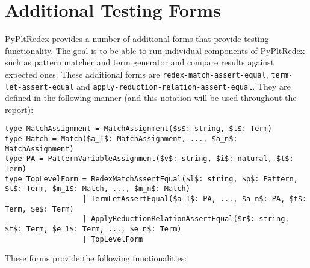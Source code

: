 \section{Additional Testing Forms}

PyPltRedex provides a number of additional forms that provide testing functionality. The goal is to be able to run individual components of PyPltRedex such as pattern matcher and term generator and compare results against expected ones. These additional forms are \texttt{redex-match-assert-equal}, \texttt{term-let-assert-equal} and \texttt{apply-reduction-relation-assert-equal}. They are defined in the following manner (and this notation will be used throughout the report):

\begin{lstlisting}
type MatchAssignment = MatchAssignment($s$: string, $t$: Term)
type Match = Match($a_1$: MatchAssignment, ..., $a_n$: MatchAssignment)
type PA = PatternVariableAssignment($v$: string, $i$: natural, $t$: Term)
type TopLevelForm = RedexMatchAssertEqual($l$: string, $p$: Pattern, $t$: Term, $m_1$: Match, ..., $m_n$: Match)
                  | TermLetAssertEqual($a_1$: PA, ..., $a_n$: PA, $t$: Term, $e$: Term)
                  | ApplyReductionRelationAssertEqual($r$: string, $t$: Term, $e_1$: Term, ..., $e_n$: Term)
                  | TopLevelForm
\end{lstlisting}

These forms provide the following functionalities:


